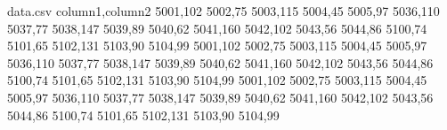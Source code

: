 

\usepackage{float}

\usepackage{tikz}

\begin{filecontents}{data.csv}
  column1,column2
  5001,102
  5002,75
  5003,115
  5004,45
  5005,97
  5036,110
  5037,77
  5038,147
  5039,89
  5040,62
  5041,160
  5042,102
  5043,56
  5044,86
  5100,74
  5101,65
  5102,131
  5103,90
  5104,99
  5001,102
  5002,75
  5003,115
  5004,45
  5005,97
  5036,110
  5037,77
  5038,147
  5039,89
  5040,62
  5041,160
  5042,102
  5043,56
  5044,86
  5100,74
  5101,65
  5102,131
  5103,90
  5104,99
  5001,102
  5002,75
  5003,115
  5004,45
  5005,97
  5036,110
  5037,77
  5038,147
  5039,89
  5040,62
  5041,160
  5042,102
  5043,56
  5044,86
  5100,74
  5101,65
  5102,131
  5103,90
  5104,99
  \end{filecontents}%